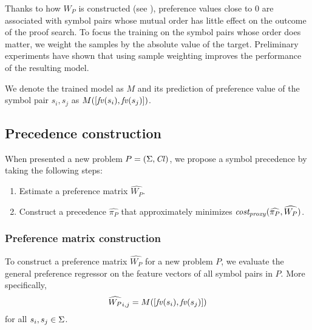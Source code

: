 Thanks to how \(W_P\) is constructed (see ),
preference values close to 0 are associated with symbol pairs whose mutual order has little effect
on the outcome of the proof search.
To focus the training on the symbol pairs whose order does matter,
we weight the samples by the absolute value of the target.
%
Preliminary experiments have shown that using sample weighting
improves the performance of the resulting model.



\newcommand{\GeneralRegressor}{M}
We denote the trained model as \(\GeneralRegressor\)
and its prediction of preference value of the symbol pair \(s_i, s_j\)
as \(\GeneralRegressor([\fv(s_i), \fv(s_j)])\).

\subsection{Precedence construction} \label{sect:construction}

When presented a new problem \(P = (\operatorname{\Sigma}, \operatorname{\mathit{Cl}})\), we propose a symbol precedence by taking the following steps:
\begin{enumerate}
	\item Estimate a preference matrix \(\widehat{W_P}\).
	\item Construct a precedence \(\widehat{\pi_P}\) that approximately minimizes
	\(\operatorname{\mathit{cost_{proxy}}}(\widehat{\pi_P}, \widehat{W_P})\).
\end{enumerate}

\subsubsection{Preference matrix construction}

To construct a preference matrix \(\widehat{W_P}\) for a new problem \(P\),
we evaluate the general preference regressor
on the feature vectors of all symbol pairs in \(P\).
More specifically,
\begin{align*}
\widehat{W_P}_{i, j} = M([\mathit{fv}(s_i), \mathit{fv}(s_j)])
\end{align*}
for all \(s_i, s_j \in \operatorname{\Sigma}\).


